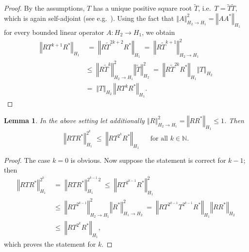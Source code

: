 \documentclass{dis}
\newtheorem{lemma}[theorem]{Lemma}
\theoremstyle{citing}
\begin{document}
\begin{proof}
By the assumptions, $T$ has a unique positive square root $\widetilde{T}$, 
i.e.~$T=\widetilde{T} \widetilde{T}$, which is again self-adjoint (see 
e.g.~\cite[Th. 9.4-2]{Krey}). 
Using the fact that ${\left\Vert {A} \right\Vert}_{H_2\to H_1}^2={\left\Vert {A A^*} \right\Vert}_{H_1}$ for every bounded 
linear operator $A:H_2\to H_1$, we obtain
\[\begin{split}
{\left\Vert {R T^{k+1} R^*} \right\Vert}_{{H_1}}& \;=\; {\left\Vert {R \widetilde{T}^{2k+2} R^*} \right\Vert}_{{H_1}}
\;=\; {\left\Vert {R \widetilde{T}^{k+1}} \right\Vert}_{{H_2}\to {H_1}}^2 \\
\;&\le\; {\left\Vert {R \widetilde{T}^k} \right\Vert}_{{H_2}\to {H_1}}^2 {\left\Vert {\widetilde{T}} \right\Vert}_{{H_2}}^2 
\;=\; {\left\Vert {R \widetilde{T}^{2k} R^*} \right\Vert}_{{H_1}}  {\left\Vert {T} \right\Vert}_{{H_2}} \\
\;&=\; {\left\Vert {T} \right\Vert}_{{H_2}}\,{\left\Vert {R T^k R^*} \right\Vert}_{{H_1}}.
\end{split}\]
\end{proof}

\begin{lemma} \label{lemma:tech_in}
In the above setting let additionally 
${\left\Vert {R} \right\Vert}_{{H_2}\to {H_1}}^2 = {\left\Vert {R R^*} \right\Vert}_{H_1} \le1$. Then 
\[
{\left\Vert {R T R^*} \right\Vert}_{{H_1}}^{2^k} \;\le\; {\left\Vert {R T^{2^k} R^*} \right\Vert}_{{H_1}}
\; \quad \text{ for all } k\in{\ensuremath{\mathbb{N}}}.
\]
\end{lemma}

\begin{proof}
The case $k=0$ is obvious. Now suppose the statement is correct for $k-1$; 
then
\[\begin{split}
{\left\Vert {R T R^*} \right\Vert}_{{H_1}}^{2^k} \;&=\; {\left\Vert {R T R^*} \right\Vert}_{{H_1}}^{2^{k-1}\, 2} 
\;\le\; {\left\Vert {R T^{2^{k-1}} R^*} \right\Vert}_{{H_1}}^2 \\
&\le\; {\left\Vert {R T^{2^{k-1}}} \right\Vert}_{{H_2}\to {H_1}}^2 {\left\Vert {R^*} \right\Vert}_{{H_1}\to {H_2}}^2
\;=\; {\left\Vert {R T^{2^{k-1}} T^{2^{k-1}} R^*} \right\Vert}_{{H_1}} {\left\Vert {R R^*} \right\Vert}_{{H_2}} \\
&\le\; {\left\Vert {R T^{2^k} R^*} \right\Vert}_{{H_1}},
\end{split}\]
which proves the statement for $k$. 
\end{proof}
\end{document}
